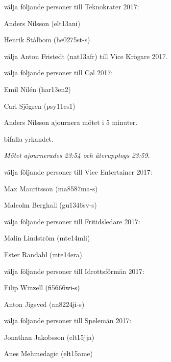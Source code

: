 \documentclass[10pt]{article}
\begin{document}
\begin{paragrafer}
\begin{paralist}
    \Mba välja följande personer till Teknokrater 2017:
    \begin{tightdashlist}
        \item Anders Nilsson (elt13ani)
        \item Henrik Stålbom (he0275st-s)
    \end{tightdashlist}

    \Mba välja Anton Fristedt (nat13afr) till Vice Krögare 2017.

    \Mba välja följande personer till Cøl 2017:
    \begin{tightdashlist}
        \item Emil Nilén (har13en2)
        \item Carl Sjögren (psy11cs1)
    \end{tightdashlist}

    Anders Nilsson \ypa ajournera mötet i 5 minuter.

    \Mba bifalla yrkandet.

    \emph{Mötet ajournerades 23:54 och återupptogs 23:59.}

    \Mba välja följande personer till Vice Entertainer 2017:
    \begin{tightdashlist}
        \item Max Mauritsson (ma8587ma-s)
        \item Malcolm Berghall (gu1346sv-s)
    \end{tightdashlist}

    \Mba välja följande personer till Fritidsledare 2017:
    \begin{tightdashlist}
        \item Malin Lindström (mte14mli)
        \item Ester Randahl (mte14era)
    \end{tightdashlist}

    \Mba välja följande personer till Idrottsförmän 2017:
    \begin{tightdashlist}
        \item Filip Winzell (fi5666wi-s)
        \item Anton Jigsved (an8224ji-s)
    \end{tightdashlist}

    \Mba välja följande personer till Spelemän 2017:
    \begin{tightdashlist}
        \item Jonathan Jakobsson (elt15jja)
        \item Anes Mehmedagic (elt15ame)
    \end{tightdashlist}


\end{paralist}
\end{paragrafer}
\end{document}
